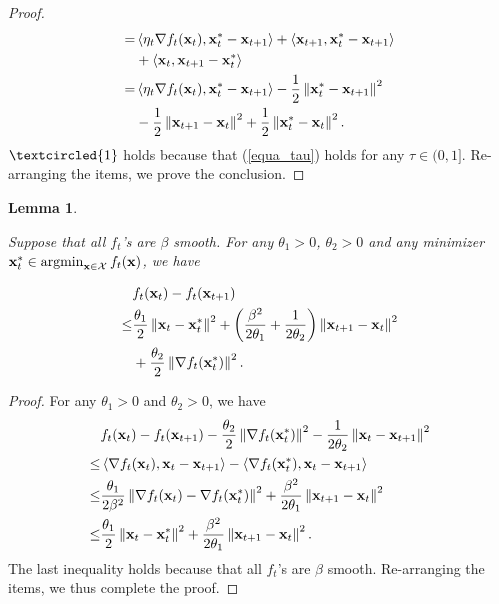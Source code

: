 \documentclass[journal]{IEEEtran}
\newtheorem{Lemma}{\bf{Lemma}}
\begin{document}
\begin{proof}
\begin{align}
= & \left\langle\eta_t \nabla f_t({\bf x}_t), {\bf x}_t^{\ast} - 
{\bf x}_{t+1} \right\rangle + \left\langle{\bf x}_{t+1}, {\bf x}_t^{\ast} - {\bf x}_{t+1} \right\rangle \\ \nonumber 
& + \left\langle{\bf x}_t, {\bf x}_{t+1} - {\bf x}_t^{\ast} \right\rangle\\ \nonumber
= & \left\langle\eta_t \nabla f_t({\bf x}_t), {\bf x}_t^{\ast} - 
{\bf x}_{t+1} \right\rangle - \frac{1}{2} \left\lVert{\bf x}_t^{\ast} - {\bf x}_{t+1}\right\rVert^2 \\ \nonumber 
& - \frac{1}{2}\left\lVert{\bf x}_{t+1} - {\bf x}_t\right\rVert^2  + \frac{1}{2}\left\lVert {\bf x}_t^{\ast} - {\bf x}_t \right\rVert^2.
\end{align} $\textcircled{1}$ holds because that  (\ref{equa_tau}) holds for any $\tau \in (0,1]$. 
 Re-arranging the items, we prove the conclusion.
\end{proof}


\begin{Lemma}
\label{lemma_f_upper_bound} 

Suppose that all $f_t$'s are $\beta$ smooth. For any $\theta_1>0$, $\theta_2>0$ and any   minimizer $\x_t^{\ast} \in \argmin_{\x\in\Xcal}f_t(\x)$, we have 

\begin{align}
\nonumber
& f_t(\x_t) - f_t(\x_{t+1}) \\ \nonumber 
\le & \frac{\theta_1}{2}\lrnorm{\x_t - \x_t^{\ast}}^2 + \lrincir{\frac{\beta^2}{2\theta_1}+\frac{1}{2\theta_2}}\lrnorm{\x_{t+1} - \x_t}^2 \\ \label{equa_f_upper_bound} 
& +\frac{\theta_2}{2}\lrnorm{\nabla f_t(\x_t^{\ast})}^2.
\end{align}
\end{Lemma}
\begin{proof}
For any $\theta_1>0$ and $\theta_2>0$, we have
\begin{align}
\nonumber
&f_t({\bf x}_t) - f_t({\bf x}_{t+1}) -\frac{\theta_2}{2}\left\lVert\nabla f_t({\bf x}_t^{\ast})\right\rVert^2 - \frac{1}{2\theta_2} \left\lVert{\bf x}_t - {\bf x}_{t+1}\right\rVert^2\\ \nonumber
\le & \left\langle\nabla f_t({\bf x}_t), {\bf x}_t - {\bf x}_{t+1} \right\rangle - \left\langle\nabla f_t({\bf x}_t^{\ast}), {\bf x}_t - {\bf x}_{t+1} \right\rangle  \\ \nonumber
\le & \frac{\theta_1}{2\beta^2}\left\lVert\nabla f_t({\bf x}_t) - \nabla f_t({\bf x}_t^{\ast})\right\rVert^2 + \frac{\beta^2}{2\theta_1}\left\lVert{\bf x}_{t+1} - {\bf x}_t\right\rVert^2 \\ \nonumber
\le & \frac{\theta_1}{2}\left\lVert{\bf x}_t - {\bf x}_t^{\ast}\right\rVert^2 + \frac{\beta^2}{2\theta_1}\left\lVert{\bf x}_{t+1} - {\bf x}_t\right\rVert^2.
\end{align} The last inequality holds because that all $f_t$'s are $\beta$ smooth. Re-arranging the items, we thus complete the proof.
\end{proof}
\end{document}
